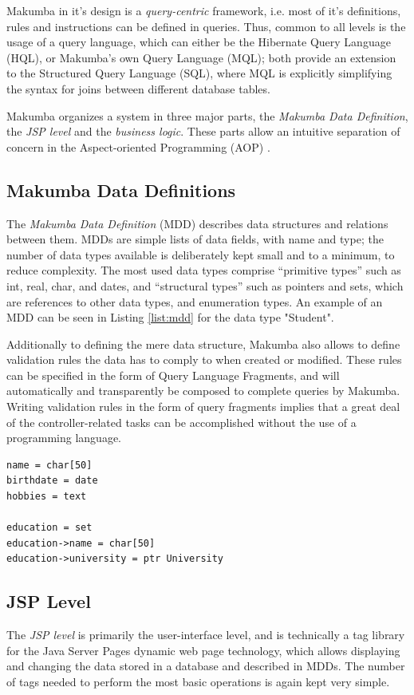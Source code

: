 \documentclass{llncs}
\begin{document}
Makumba in it's design is a \textit{query-centric} framework, i.e. most of it's definitions, rules and instructions can be defined in queries. Thus, common to all levels is the usage of a query language, which can either be the Hibernate Query Language (HQL), or Makumba's own Query Language (MQL); both provide an extension to the Structured Query Language (SQL), where MQL is explicitly simplifying the syntax for joins between different database tables.

Makumba organizes a system in three major parts, the \textit{Makumba Data Definition}, the \textit{JSP level} and the \textit{business logic}. These parts allow an intuitive separation of concern in the Aspect-oriented Programming (AOP) \cite{Kiczales97aspect-orientedprogramming}.

\subsection{Makumba Data Definitions}
The \textit{Makumba Data Definition} (MDD) describes data structures and relations between them. MDDs are simple lists of data fields, with name and type; the number of data types available is deliberately kept small and to a minimum, to reduce complexity. The most used data types comprise ``primitive types'' such as int, real, char, and dates, and ``structural types'' such as pointers and sets, which are references to other data types, and enumeration types. An example of an MDD can be seen in Listing \ref{list:mdd} for the data type "Student".

Additionally to defining the mere data structure, Makumba also allows to define validation rules the data has to comply to when created or modified. These rules can be specified in the form of Query Language Fragments, and will automatically and transparently be composed to complete queries by Makumba. Writing validation rules in the form of query fragments implies that a great deal of the controller-related tasks can be accomplished without the use of a programming language.

\lstset{basicstyle=\small, captionpos=b, caption=Makumba Data Definition "Student", label=list:mdd, frame=shadowbox}
\begin{lstlisting}
name = char[50]
birthdate = date
hobbies = text

education = set
education->name = char[50]
education->university = ptr University
\end{lstlisting}

\subsection{JSP Level}
The \textit{JSP level} is primarily the user-interface level, and is technically a tag library for the Java Server Pages dynamic web page technology, which allows displaying and changing the data stored in a database and described in MDDs. The number of tags needed to perform the most basic operations is again kept very simple.
\end{document}
